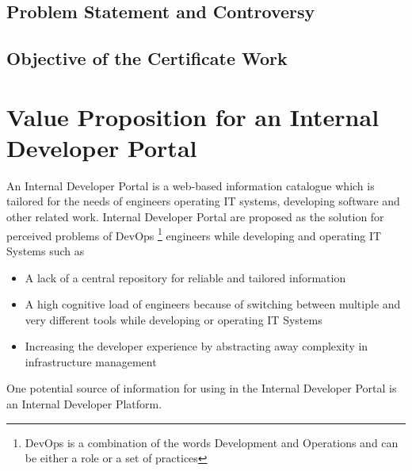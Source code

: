 \documentclass[a4paper,12pt]{article}
\begin{document}
    \subsection{Problem Statement and Controversy}
    \label{subsec:iproblemstatement}

    \subsection{Objective of the Certificate Work}
    \label{subsec:iobjective}

    \pagebreak


    \section{Value Proposition for an Internal Developer Portal}
    \label{sec:vp}
    An Internal Developer Portal is a web-based information catalogue which is tailored for the needs of
    engineers operating IT systems, developing software and other related work.
    Internal Developer Portal are proposed as the solution for perceived problems\parencite{backstagestory} of DevOps
    \footnote{DevOps is a combination of the words Development and Operations and can be either a role or a set of practices}
    engineers while developing and operating IT Systems such as
    \begin{itemize}
        \item A lack of a central repository for reliable and tailored information
        \item A high cognitive load of engineers because of switching between multiple and very different tools while developing or operating IT Systems
        \item Increasing the developer experience by abstracting away complexity in infrastructure management
    \end{itemize}
    One potential source of information for using in the Internal Developer Portal is an Internal Developer Platform.
\end{document}
